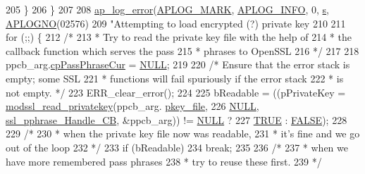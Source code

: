 \begin{DoxyCode}
{{{205         \}
206     \}
207 
208     \hyperlink{group__APACHE__CORE__LOG_ga5e6676c87418af7a1d323a116c78ecb4}{ap\_log\_error}(\hyperlink{group__APACHE__CORE__LOG_ga655e126996849bcb82e4e5a14c616f4a}{APLOG\_MARK}, \hyperlink{group__APACHE__CORE__LOG_ga47fafbef7e478babdd92e90407f95b19}{APLOG\_INFO}, 0, \hyperlink{group__APACHE__CORE__LISTEN_ga9359ed159c8b295541e3770172d34550}{s}, 
      \hyperlink{group__APACHE__CORE__LOG_ga1dee8a07e06bc5b3de8b89662c2cd666}{APLOGNO}(02576)
209                  \textcolor{stringliteral}{"Attempting to load encrypted (?) private key %
210 
211     \textcolor{keywordflow}{for} (;;) \{
212         \textcolor{comment}{/*}
213 \textcolor{comment}{         * Try to read the private key file with the help of}
214 \textcolor{comment}{         * the callback function which serves the pass}
215 \textcolor{comment}{         * phrases to OpenSSL}
216 \textcolor{comment}{         */}
217 
218         ppcb\_arg.\hyperlink{structpphrase__cb__arg__t_af6aaf85042706fa2215ce1164a2aa7eb}{cpPassPhraseCur} = \hyperlink{pcre_8txt_ad7f989d16aa8ca809a36bc392c07fba1}{NULL};
219 
220         \textcolor{comment}{/* Ensure that the error stack is empty; some SSL}
221 \textcolor{comment}{         * functions will fail spuriously if the error stack}
222 \textcolor{comment}{         * is not empty. */}
223         ERR\_clear\_error();
224 
225         bReadable = ((pPrivateKey = \hyperlink{group__MOD__SSL__UTIL_ga82752d8eb9f5dab0b40d7b18d741e3bc}{modssl\_read\_privatekey}(ppcb\_arg.
      \hyperlink{structpphrase__cb__arg__t_afc01b5b93a45bd50c5aa697680921d65}{pkey\_file},
226                      \hyperlink{pcre_8txt_ad7f989d16aa8ca809a36bc392c07fba1}{NULL}, \hyperlink{ssl__engine__pphrase_8c_a385113167d9add46b16dc1000e080711}{ssl\_pphrase\_Handle\_CB}, &ppcb\_arg)) != 
      \hyperlink{pcre_8txt_ad7f989d16aa8ca809a36bc392c07fba1}{NULL} ?
227                      \hyperlink{group__MOD__SSL__PRIVATE_gaa8cecfc5c5c054d2875c03e77b7be15d}{TRUE} : \hyperlink{group__MOD__SSL__PRIVATE_gaa93f0eb578d23995850d61f7d61c55c1}{FALSE});
228 
229         \textcolor{comment}{/*}
230 \textcolor{comment}{         * when the private key file now was readable,}
231 \textcolor{comment}{         * it's fine and we go out of the loop}
232 \textcolor{comment}{         */}
233         \textcolor{keywordflow}{if} (bReadable)
234            \textcolor{keywordflow}{break};
235 
236         \textcolor{comment}{/*}
237 \textcolor{comment}{         * when we have more remembered pass phrases}
238 \textcolor{comment}{         * try to reuse these first.}
239 \textcolor{comment}{         */}
}}}}
\end{DoxyCode}
